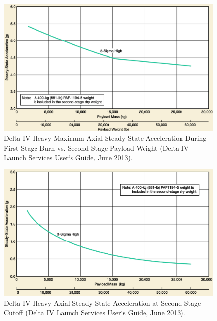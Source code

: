 \begin{figure}[h!]
\centering
\includegraphics[scale=0.3]{figures/Orbiter/g_staging.png}
\caption{Delta IV Heavy Maximum Axial Steady-State Acceleration During First-Stage Burn vs. Second Stage Payload Weight (Delta IV Launch Services User‘s Guide, June 2013).\cite{Atlasm}}
\label{fig:gloads}
\end{figure}

\begin{figure}[h!]
\centering
\includegraphics[scale=0.3]{figures/Orbiter/g_2ndstage.png}
\caption{Delta IV Heavy Axial Steady-State Acceleration at Second Stage Cutoff (Delta IV Launch Services User‘s Guide, June 2013).\cite{Atlasm}}
\end{figure}

